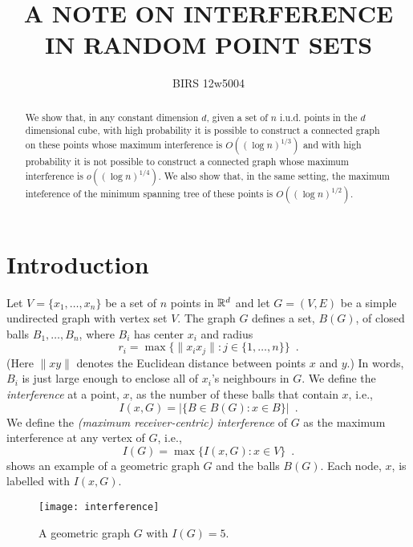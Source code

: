 \documentclass{patmorin}
\title{\MakeTextUppercase{A Note on Interference in Random Point Sets}}
\author{BIRS 12w5004}
\begin{document}
\maketitle

\begin{abstract}
  We show that, in any constant dimension $d$, given a set of $n$
  i.u.d. points in the $d$ dimensional cube, with high probability it is
  possible to construct a connected graph on these points whose maximum
  interference is $O((\log n)^{1/3})$ and with high probability it is
  not possible to construct a connected graph whose maximum interference
  is $o((\log n)^{1/4})$.  We also show that, in the same setting, the
  maximum inteference of the minimum spanning tree of these points is
  $O((\log n)^{1/2})$.
\end{abstract}

\section{Introduction}


Let $V=\{x_1,\ldots,x_n\}$ be a set of $n$ points in $\mathbb{R}^d$ and let
$G=(V,E)$ be a simple undirected graph with vertex set $V$.  The graph
$G$ defines a set, $B(G)$, of closed balls $B_1,\ldots,B_n$, where $B_i$
has center $x_i$ and radius
\[
   r_i = \max\{\|x_ix_j\| : j\in\{1,\ldots,n\}\} \enspace .
\]
(Here $\|xy\|$ denotes the Euclidean distance between points $x$ and $y$.)
In words, $B_i$ is just large enough to enclose all of $x_i$'s neighbours
in $G$.  We define the \emph{interference} at a point, $x$, as the number
of these balls that contain $x$, i.e.,
\[
    I(x,G) = |\{B\in B(G) : x\in B\}| \enspace .
\]
We define the \emph{(maximum receiver-centric) interference} of $G$ as the
maximum interference at any vertex of $G$, i.e.,
\[
   I(G) = \max\{I(x,G) : x\in V\} \enspace .
\]
 shows an example of a geometric graph $G$ and the
balls $B(G)$.  Each node, $x$, is labelled with $I(x,G)$.
\begin{figure}
  \begin{center}
    \texttt{[image: interference]}
  \end{center}
  \caption{A geometric graph $G$ with $I(G)=5$.}
\end{figure}
\end{document}
